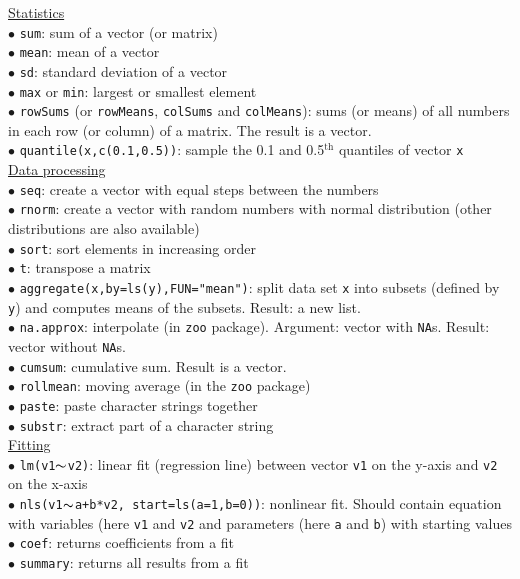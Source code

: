 \documentclass[a4paper,11pt,twocolumn,tablecaptionabove]{scrartcl} %
\begin{document}
\noindent \underline{Statistics}\\
$\bullet$ \texttt{sum}: sum of a vector (or matrix)\\
$\bullet$ \texttt{mean}: mean of a vector\\
$\bullet$ \texttt{sd}: standard deviation of a vector\\
$\bullet$ \texttt{max} or \texttt{min}: largest or smallest element\\
$\bullet$ \texttt{rowSums} (or \texttt{rowMeans}, \texttt{colSums} and \texttt{colMeans}): 
sums (or means) of all numbers in each row (or column) of a matrix. The result is a vector.\\
$\bullet$ \texttt{quantile(x,c(0.1,0.5))}: sample the 0.1 and 0.5$\mathrm{^{th}}$ quantiles of vector \texttt{x}\\

\noindent \underline{Data processing}\\
$\bullet$ \texttt{seq}: create a vector with equal steps between the numbers\\
$\bullet$ \texttt{rnorm}: create a vector with random numbers with normal distribution (other distributions are also available)\\
$\bullet$ \texttt{sort}: sort elements in increasing order\\
$\bullet$ \texttt{t}: transpose a matrix\\
$\bullet$ \texttt{aggregate(x,by=ls(y),FUN="mean")}: split data set \texttt{x} into subsets (defined by \texttt{y}) and computes means of the subsets. Result: a new list.\\
$\bullet$ \texttt{na.approx}: interpolate (in \texttt{zoo} package). Argument: vector with \texttt{NA}s. Result: vector without \texttt{NA}s.\\
$\bullet$ \texttt{cumsum}: cumulative sum. Result is a vector.\\
$\bullet$ \texttt{rollmean}: moving average (in the \texttt{zoo} package)\\
$\bullet$ \texttt{paste}: paste character strings together\\
$\bullet$ \texttt{substr}: extract part of a character string\\

\noindent \underline{Fitting}\\
$\bullet$ \texttt{lm(v1}$\thicksim$\texttt{v2)}: linear fit (regression line) between vector \texttt{v1} on the y-axis and \texttt{v2} on the x-axis\\
$\bullet$ \texttt{nls(v1}$\thicksim$\texttt{a+b*v2, start=ls(a=1,b=0))}: nonlinear fit. Should contain equation with variables (here \texttt{v1} and \texttt{v2} and parameters (here \texttt{a} and \texttt{b}) with starting values\\
$\bullet$ \texttt{coef}: returns coefficients from a fit\\
$\bullet$ \texttt{summary}: returns all results from a fit\\
\end{document}
